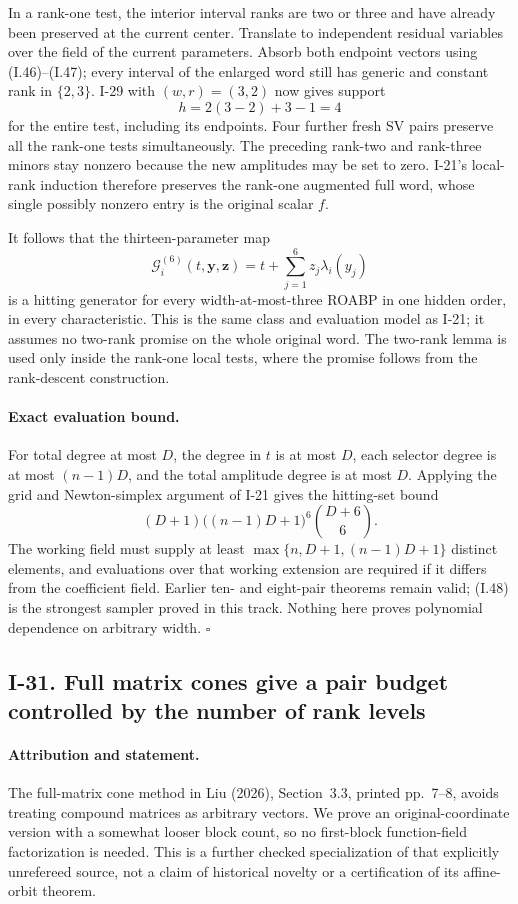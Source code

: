 \documentclass[11pt,a4paper]{article}
\theoremstyle{definition}\newtheorem{definition}{Definition}
\begin{document}
In a rank-one test, the interior interval ranks are two or
three and have already been preserved at the current center.
Translate to independent residual variables over the field
of the current parameters.  Absorb both endpoint vectors
using (I.46)--(I.47); every interval of the enlarged word
still has generic and constant rank in $\{2,3\}$.
I-29 with $(w,r)=(3,2)$ now gives support
\[
 h=2(3-2)+3-1=4
\]
for the entire test, including its endpoints.  Four further
fresh SV pairs preserve all the rank-one tests simultaneously.
The preceding rank-two and rank-three minors stay nonzero
because the new amplitudes may be set to zero.
I-21's local-rank induction therefore preserves the rank-one
augmented full word, whose single possibly nonzero entry is
the original scalar $f$.

It follows that the thirteen-parameter map
\[
 \mathcal G_i^{(6)}(t,\mathbf y,\mathbf z)
      =t+\sum_{j=1}^{6}z_j\lambda_i(y_j)
 \tag{I.48}
\]
is a hitting generator for every width-at-most-three ROABP
in one hidden order, in every characteristic.  This is the
same class and evaluation model as I-21; it assumes no
two-rank promise on the whole original word.  The two-rank
lemma is used only inside the rank-one local tests, where
the promise follows from the rank-descent construction.

\paragraph{Exact evaluation bound.}
For total degree at most $D$, the degree in $t$ is at most
$D$, each selector degree is at most $(n-1)D$, and the total
amplitude degree is at most $D$.  Applying the grid and
Newton-simplex argument of I-21 gives the hitting-set bound
\[
 (D+1)\bigl((n-1)D+1\bigr)^6\binom{D+6}{6}.
 \tag{I.49}
\]
The working field must supply at least
$\max\{n,D+1,(n-1)D+1\}$ distinct elements, and evaluations
over that working extension are required if it differs
from the coefficient field.  Earlier ten- and eight-pair
theorems remain valid; (I.48) is the strongest sampler
proved in this track.  Nothing here proves polynomial
dependence on arbitrary width.
\hfill$\square$


\subsection{I-31. Full matrix cones give a pair budget controlled by the number of rank levels}
\label{I-31}

\paragraph{Attribution and statement.}
The full-matrix cone method in Liu (2026), Section~3.3,
printed pp.~7--8, avoids treating compound matrices as
arbitrary vectors.  We prove an original-coordinate version
with a somewhat looser block count, so no first-block
function-field factorization is needed.  This is a further
checked specialization of that explicitly unrefereed source,
not a claim of historical novelty or a certification of its
affine-orbit theorem.
\end{document}
